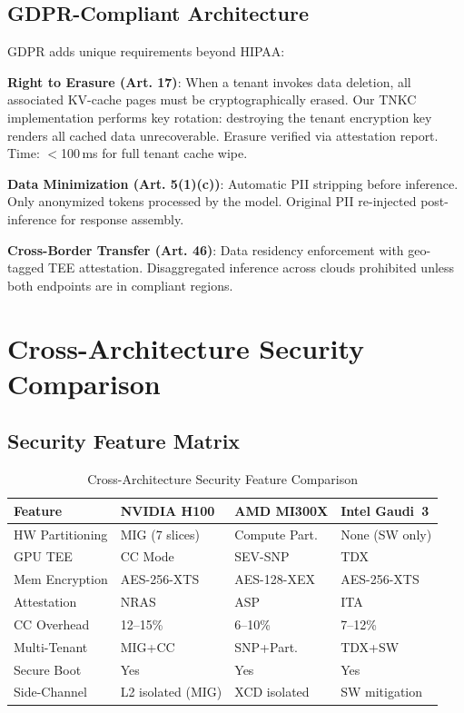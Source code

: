 \documentclass[conference,10pt]{IEEEtran}
\begin{document}
\subsection{GDPR-Compliant Architecture}

GDPR adds unique requirements beyond HIPAA:

\textbf{Right to Erasure (Art. 17)}: When a tenant invokes data deletion, all associated KV-cache pages must be cryptographically erased. Our TNKC implementation performs key rotation: destroying the tenant encryption key renders all cached data unrecoverable. Erasure verified via attestation report. Time: $<$100\,ms for full tenant cache wipe.

\textbf{Data Minimization (Art. 5(1)(c))}: Automatic PII stripping before inference. Only anonymized tokens processed by the model. Original PII re-injected post-inference for response assembly.

\textbf{Cross-Border Transfer (Art. 46)}: Data residency enforcement with geo-tagged TEE attestation. Disaggregated inference across clouds prohibited unless both endpoints are in compliant regions.


\section{Cross-Architecture Security Comparison}
\label{sec:crossarch}

\subsection{Security Feature Matrix}

\begin{table}[!htbp]
\caption{Cross-Architecture Security Feature Comparison}
\label{tab:secfeat}
\centering\footnotesize
\begin{tabular}{@{}lp{1.5cm}p{1.5cm}p{1.5cm}@{}}
\toprule
\textbf{Feature} & \textbf{NVIDIA H100} & \textbf{AMD MI300X} & \textbf{Intel Gaudi~3} \\
\midrule
HW Partitioning & MIG (7 slices) & Compute Part. & None (SW only) \\
GPU TEE & CC Mode & SEV-SNP & TDX \\
Mem Encryption & AES-256-XTS & AES-128-XEX & AES-256-XTS \\
Attestation & NRAS & ASP & ITA \\
CC Overhead & 12--15\% & 6--10\% & 7--12\% \\
Multi-Tenant & MIG+CC & SNP+Part. & TDX+SW \\
Secure Boot & Yes & Yes & Yes \\
Side-Channel & L2 isolated (MIG) & XCD isolated & SW mitigation \\
\bottomrule
\end{tabular}
\end{table}
\end{document}
